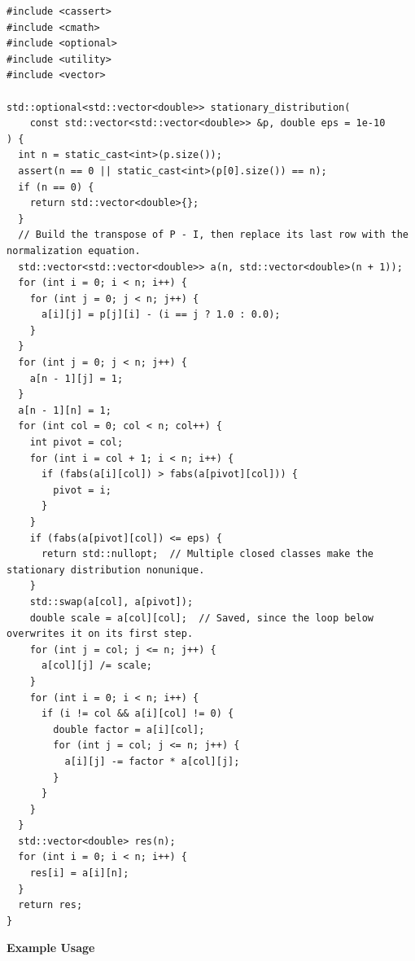 \begin{lstlisting}[style=cpp]
#include <cassert>
#include <cmath>
#include <optional>
#include <utility>
#include <vector>

std::optional<std::vector<double>> stationary_distribution(
    const std::vector<std::vector<double>> &p, double eps = 1e-10
) {
  int n = static_cast<int>(p.size());
  assert(n == 0 || static_cast<int>(p[0].size()) == n);
  if (n == 0) {
    return std::vector<double>{};
  }
  // Build the transpose of P - I, then replace its last row with the normalization equation.
  std::vector<std::vector<double>> a(n, std::vector<double>(n + 1));
  for (int i = 0; i < n; i++) {
    for (int j = 0; j < n; j++) {
      a[i][j] = p[j][i] - (i == j ? 1.0 : 0.0);
    }
  }
  for (int j = 0; j < n; j++) {
    a[n - 1][j] = 1;
  }
  a[n - 1][n] = 1;
  for (int col = 0; col < n; col++) {
    int pivot = col;
    for (int i = col + 1; i < n; i++) {
      if (fabs(a[i][col]) > fabs(a[pivot][col])) {
        pivot = i;
      }
    }
    if (fabs(a[pivot][col]) <= eps) {
      return std::nullopt;  // Multiple closed classes make the stationary distribution nonunique.
    }
    std::swap(a[col], a[pivot]);
    double scale = a[col][col];  // Saved, since the loop below overwrites it on its first step.
    for (int j = col; j <= n; j++) {
      a[col][j] /= scale;
    }
    for (int i = 0; i < n; i++) {
      if (i != col && a[i][col] != 0) {
        double factor = a[i][col];
        for (int j = col; j <= n; j++) {
          a[i][j] -= factor * a[col][j];
        }
      }
    }
  }
  std::vector<double> res(n);
  for (int i = 0; i < n; i++) {
    res[i] = a[i][n];
  }
  return res;
}
\end{lstlisting}
\textbf{Example Usage}\par

